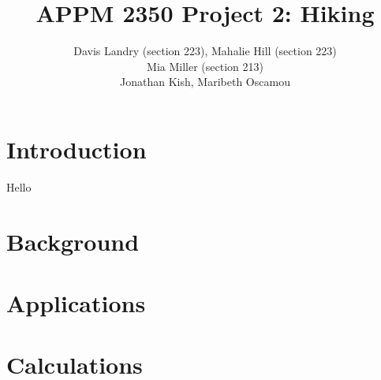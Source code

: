 \documentclass[12pt]{article}   %
\theoremstyle{definition}
\numberwithin{equation}{section}
\begin{document}
\parskip10pt
\parindent0pt
\baselineskip15pt
\doublespacing

\title{APPM 2350 Project 2: Hiking}
\author{Davis Landry (section 223), Mahalie Hill (section 223)\\Mia Miller (section 213) \\ Jonathan Kish, Maribeth Oscamou}

\pagestyle{fancy}
\renewcommand{\sectionmark}[1]{\markright{#1}{}}

\fancyhf{}

\rhead{\fancyplain{}{\thepage}} %
\lhead{\fancyplain{}{\rightmark }} %

\maketitle
\newpage
\tableofcontents
\newpage
\newpage
\lhead{]Landry, Hill, Miller Project 1}

\section{Introduction} \label{APPM2350proj01sec01}
\quad Hello

\section{Background} \label{APPM2350proj01sec02}


\section{Applications}
\label{APPM2350proj01sec03}


\section{Calculations} \label{APPM2350proj01sec05}
\end{document}
